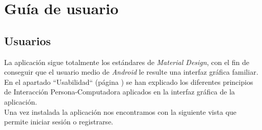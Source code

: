\documentclass[twoside]{report}
\begin{document}
\section{Guía de usuario}

\subsection{Usuarios}
La aplicación sigue totalmente los estándares de \textit{Material Design}, con el fin de conseguir que el usuario medio de \textit{Android} le resulte una interfaz gráfica familiar. En el apartado “Usabilidad“ (página \pageref{usabilitymatters}) se han explicado los diferentes principios de Interacción Persona-Computadora aplicados en la interfaz gráfica de la aplicación.\\

Una vez instalada la aplicación nos encontramos con la siguiente vista que permite iniciar sesión o registrarse.
\end{document}
